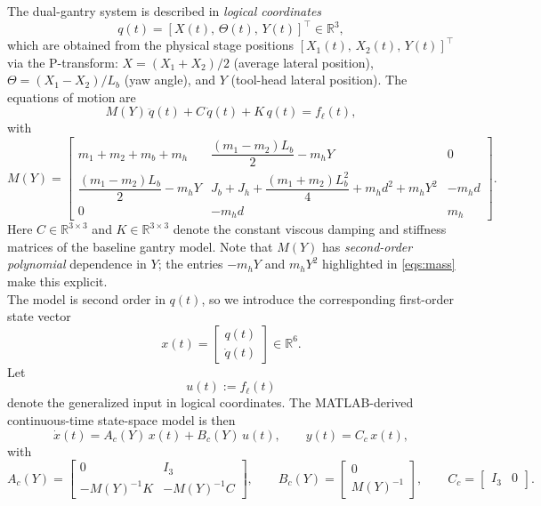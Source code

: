 \documentclass[11pt]{article}
\newcommand{\R}{\mathbb{R}}
\begin{document}
The dual-gantry system is described in \emph{logical coordinates}
\[
q(t) = [X(t),\,\Theta(t),\,Y(t)]^\top \in \R^3,
\]
which are obtained from the physical stage positions $[X_1(t),\, X_2(t),\, Y(t)]^\top$ via the P-transform: $X = (X_1+X_2)/2$ (average lateral position), $\Theta = (X_1-X_2)/L_b$ (yaw angle), and $Y$ (tool-head lateral position). The equations of motion are
\begin{equation}
    M(Y)\,\ddot{q}(t) + C\,\dot{q}(t) + K\,q(t) = f_\ell(t),
    \label{eqs:eom}
\end{equation}
with
\begin{equation}
    M(Y) =
    \begin{bmatrix}
        m_1 + m_2 + m_b + m_h &
        \dfrac{(m_1-m_2)L_b}{2} - m_h Y &
        0 \\
        \dfrac{(m_1-m_2)L_b}{2} - m_h Y &
        J_b + J_h + \dfrac{(m_1+m_2)L_b^2}{4} + m_h d^2 + m_h Y^2 &
        -m_h d \\
        0 & -m_h d & m_h
    \end{bmatrix}.
    \label{eqs:mass}
\end{equation}
Here $C \in \R^{3\times3}$ and $K \in \R^{3\times3}$ denote the constant
viscous damping and stiffness matrices of the baseline gantry model. Note that $M(Y)$ has \emph{second-order polynomial} dependence in $Y$; the entries $-m_h Y$ and $m_h Y^2$ highlighted in \eqref{eqs:mass} make this explicit.
\\
The model is second order in $q(t)$, so we introduce the corresponding first-order
state vector
\begin{equation}
    x(t) = \begin{bmatrix} q(t) \\ \dot{q}(t) \end{bmatrix} \in \R^6.
    \label{eqs:state}
\end{equation}
Let
\begin{equation}
    u(t) := f_\ell(t)
    \label{eqs:input}
\end{equation}
denote the generalized input in logical coordinates. The MATLAB-derived
continuous-time state-space model is then
\begin{equation}
    \dot{x}(t) = A_c(Y)\,x(t) + B_c(Y)\,u(t),
    \qquad
    y(t) = C_c\,x(t),
    \label{eqs:ctss}
\end{equation}
with
\begin{equation}
    A_c(Y) =
    \begin{bmatrix}
        0 & I_3 \\
        -M(Y)^{-1}K & -M(Y)^{-1}C
    \end{bmatrix},
    \qquad
    B_c(Y) =
    \begin{bmatrix}
        0 \\
        M(Y)^{-1}
    \end{bmatrix},
    \qquad
    C_c = \begin{bmatrix} I_3 & 0 \end{bmatrix}.
    \label{eqs:ctmats}
\end{equation}
\end{document}
